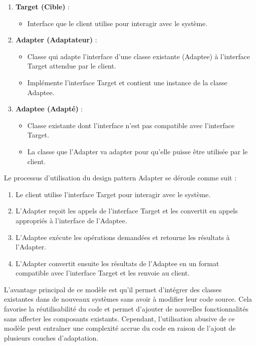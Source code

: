 \documentclass[french]{article}
\begin{document}
\begin{enumerate}
    \item \textbf{Target (Cible)} :
    \begin{itemize}
        \item Interface que le client utilise pour interagir avec le système.
    \end{itemize}
    
    \item \textbf{Adapter (Adaptateur)} :
    \begin{itemize}
        \item Classe qui adapte l'interface d'une classe existante (Adaptee) à l'interface Target attendue par le client.
        \item Implémente l'interface Target et contient une instance de la classe Adaptee.
    \end{itemize}
    
    \item \textbf{Adaptee (Adapté)} :
    \begin{itemize}
        \item Classe existante dont l'interface n'est pas compatible avec l'interface Target.
        \item La classe que l'Adapter va adapter pour qu'elle puisse être utilisée par le client.
    \end{itemize}
\end{enumerate}

Le processus d'utilisation du design pattern Adapter se déroule comme suit :

\begin{enumerate}
    \item Le client utilise l'interface Target pour interagir avec le système.
    \item L'Adapter reçoit les appels de l'interface Target et les convertit en appels appropriés à l'interface de l'Adaptee.
    \item L'Adaptee exécute les opérations demandées et retourne les résultats à l'Adapter.
    \item L'Adapter convertit ensuite les résultats de l'Adaptee en un format compatible avec l'interface Target et les renvoie au client.
\end{enumerate}

L'avantage principal de ce modèle est qu'il permet d'intégrer des classes existantes dans de nouveaux systèmes sans avoir à modifier leur code source. Cela favorise la réutilisabilité du code et permet d'ajouter de nouvelles fonctionnalités sans affecter les composants existants. Cependant, l'utilisation abusive de ce modèle peut entraîner une complexité accrue du code en raison de l'ajout de plusieurs couches d'adaptation.
\end{document}
